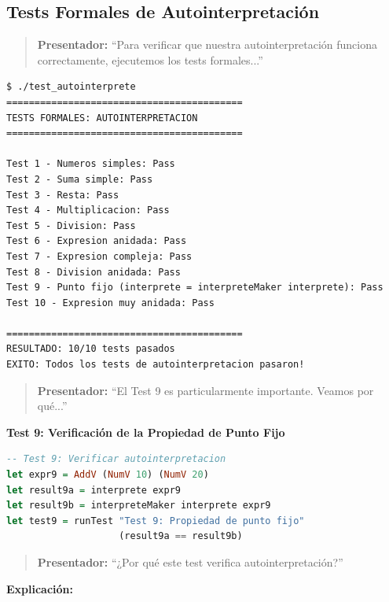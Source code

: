 \documentclass[12pt]{article}
\begin{document}
\newpage
\subsection*{Tests Formales de Autointerpretación}

\begin{quote}
\textbf{Presentador:} ``Para verificar que nuestra autointerpretación funciona correctamente, ejecutemos los tests formales...''
\end{quote}

\begin{verbatim}
$ ./test_autointerprete
==========================================
TESTS FORMALES: AUTOINTERPRETACION
==========================================

Test 1 - Numeros simples: Pass
Test 2 - Suma simple: Pass
Test 3 - Resta: Pass
Test 4 - Multiplicacion: Pass
Test 5 - Division: Pass
Test 6 - Expresion anidada: Pass
Test 7 - Expresion compleja: Pass
Test 8 - Division anidada: Pass
Test 9 - Punto fijo (interprete = interpreteMaker interprete): Pass
Test 10 - Expresion muy anidada: Pass

==========================================
RESULTADO: 10/10 tests pasados
EXITO: Todos los tests de autointerpretacion pasaron!
\end{verbatim}

\begin{quote}
\textbf{Presentador:} ``El Test 9 es particularmente importante. Veamos por qué...''
\end{quote}

\textbf{Test 9: Verificación de la Propiedad de Punto Fijo}

\begin{lstlisting}[language=Haskell]
-- Test 9: Verificar autointerpretacion
let expr9 = AddV (NumV 10) (NumV 20)
let result9a = interprete expr9
let result9b = interpreteMaker interprete expr9
let test9 = runTest "Test 9: Propiedad de punto fijo"
                    (result9a == result9b)
\end{lstlisting}

\begin{quote}
\textbf{Presentador:} ``¿Por qué este test verifica autointerpretación?''
\end{quote}

\textbf{Explicación:}
\end{document}
